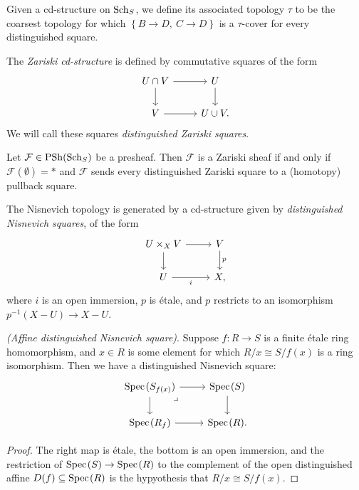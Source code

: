 \documentclass[11pt,openany]{book}
\renewcommand{\Pre}{\mathrm{PSh}}
\begin{document}
\begin{terminology} Given a cd-structure on $\mathrm{Sch}_S$, we define its associated topology $\tau$ to be the coarsest topology for which $\left\{ B\to D,\ C\to D \right\}$ is a $\tau$-cover for every distinguished square.
\end{terminology}



\begin{example} The \textit{Zariski cd-structure} is defined by commutative squares of the form
\[\begin{tikzcd}
    U\cap V\rar\dar & U\dar\\
    V\rar & U\cup V.
\end{tikzcd} \]
We will call these squares \textit{distinguished Zariski squares}.
\end{example}


\begin{theorem} Let $\mathcal{F} \in \Pre(\Sch_S)$ be a presheaf. Then $\mathcal{F}$ is a Zariski sheaf if and only if $\mathcal{F}(\emptyset) = \ast$ and $\mathcal{F}$ sends every distinguished Zariski square to a (homotopy) pullback square.
\end{theorem}






\begin{example} The Nisnevich topology is generated by a cd-structure given by \textit{distinguished Nisnevich squares}, of the form
\[ \begin{tikzcd}
    U \times_X V\rar\dar & V\dar["p" right]\\
    U\rar["i" below] & X,
\end{tikzcd} \]
where $i$ is an open immersion, $p$ is \'etale, and $p$ restricts to an isomorphism $p^{-1}(X-U)\to X-U$.
\end{example}

\begin{example}\label{ex:affine-distinguished-nisnevich-square} \textit{(Affine distinguished Nisnevich square)}. Suppose $f: R \to S$ is a finite \'etale ring homomorphism, and $x\in R$ is some element for which $R/x \cong S/f(x)$ is a ring isomorphism. Then we have a distinguished Nisnevich square:
\[ \begin{tikzcd}
    \Spec(S_{f(x)})\rar\dar\pb & \Spec(S)\dar\\
    \Spec(R_f)\rar & \Spec(R).
\end{tikzcd} \]
\end{example}
\begin{proof} The right map is \'etale, the bottom is an open immersion, and the restriction of $\text{Spec}\hspace{0.1em}(S) \to \text{Spec}\hspace{0.1em}(R)$ to the complement of the open distinguished affine $D(f) \subseteq \text{Spec}\hspace{0.1em}(R)$ is the hypyothesis that $R/x \cong S/f(x)$.
\end{proof}
\end{document}
